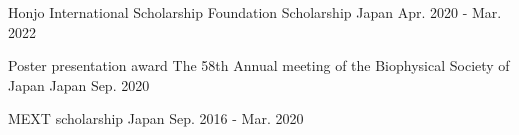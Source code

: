 

\begin{cvhonors}

  \cvhonor
    {Honjo International Scholarship Foundation Scholarship \newline} %
    {} %
    {Japan \newline} %
    {Apr. 2020 - Mar. 2022} %

  \cvhonor
    {Poster presentation award} %
    {The 58th Annual meeting of the Biophysical Society of Japan} %
    {Japan} %
    {Sep. 2020} %



  \cvhonor
    {MEXT scholarship \newline} %
    {} %
    {Japan \newline} %
    {Sep. 2016 - Mar. 2020} %

\end{cvhonors}


